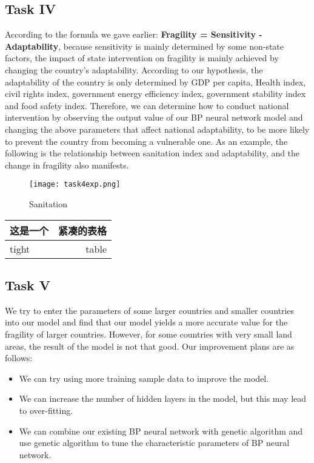 \documentclass{mcmthesis}
\begin{document}
\subsection{Task IV}
According to the formula we gave earlier:
\textbf{Fragility = Sensitivity - Adaptability}, 
because sensitivity is mainly determined by some non-state 
factors, the impact of state intervention on fragility 
is mainly achieved by changing the country's adaptability. 
According to our hypothesis, the adaptability of the country 
is only determined by GDP per capita, Health index, civil 
rights index, government energy efficiency index, government 
stability index and food safety index. Therefore, we can 
determine how to conduct national intervention by observing 
the output value of our BP neural network model and changing 
the above parameters that affect national adaptability, to be 
more likely to prevent the country from becoming a vulnerable 
one. As an example, the following is the relationship between 
sanitation index and adaptability, and the change in fragility 
also manifests.
\begin{figure}[htbp]
  \centering
  \texttt{[image: task4exp.png]}
  \caption{Sanitation}
  \label{fig:sanitation}
\end{figure}

\begin{tabular} {|l|r|}  
  \hline  
  这是一个 & 紧凑的表格 \\ \hline  
  tight & table \\ \hline  
  \end{tabular}  

\subsection{Task V}
We try to enter the parameters of some larger countries and 
smaller countries into our model and find that our model yields 
a more accurate value for the fragility of larger countries. 
However, for some countries with very small land areas, the 
result of the model is not that good. Our improvement plans 
are as follows:
\begin{itemize}
  \item We can try using more training sample data to improve the model.
  \item We can increase the number of hidden layers in the model, but 
  this may lead to over-fitting.
  \item We can combine our existing BP neural network with genetic 
  algorithm and use genetic algorithm to tune the characteristic 
  parameters of BP neural network.
\end{itemize}
\end{document}
